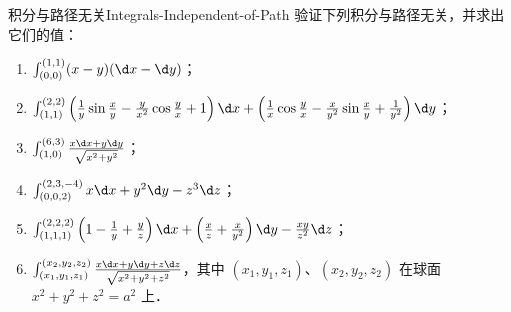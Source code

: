 \begin{problem}{积分与路径无关}{Integrals-Independent-of-Path}
    验证下列积分与路径无关，并求出它们的值：
    \begin{enumerate}
        \item $\int_{(0,0)}^{(1,1)} (x-y)(\d x - \d y)$；
        \item $\int_{(1,1)}^{(2,2)} \left( \frac{1}{y} \sin \frac{x}{y} - \frac{y}{x^2} \cos \frac{y}{x} + 1 \right) \d x + \left( \frac{1}{x} \cos \frac{y}{x} - \frac{x}{y^2} \sin \frac{x}{y} + \frac{1}{y^2} \right) \d y$；
        \item $\int_{(1,0)}^{(6,3)} \frac{x \d x + y \d y}{\sqrt{x^2 + y^2}}$；
        \item $\int_{(0,0,2)}^{(2,3,-4)} x \d x + y^2 \d y - z^3 \d z$；
        \item $\int_{(1,1,1)}^{(2,2,2)} \left( 1 - \frac{1}{y} + \frac{y}{z} \right) \d x + \left( \frac{x}{z} + \frac{x}{y^2} \right) \d y - \frac{xy}{z^2} \d z$；
        \item $\int_{(x_1,y_1,z_1)}^{(x_2,y_2,z_2)} \frac{x \d x + y \d y + z \d z}{\sqrt{x^2+y^2+z^2}}$，其中 $(x_1, y_1, z_1)$、$(x_2, y_2, z_2)$ 在球面 $x^2+y^2+z^2 = a^2$ 上．
    \end{enumerate}
\end{problem}

